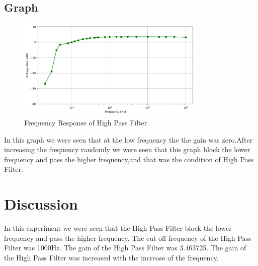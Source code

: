 \documentclass[12pt]{article}
\begin{document}
\newpage
\subsection{Graph}

\begin{figure}[h]
    \centering
    \includegraphics[width=0.8\textwidth]{HPF_Graph.png}
    \caption{Frequency Response of High Pass Filter}
\end{figure}

In this graph we were seen that at the low frequency the the gain was zero.After increasing the frequency randomly we were seen that this graph block the lower frequency and pass the higher frequency,and that was the condition of High Pass Filter.

\section{Discussion}
In this experiment we were seen that the High Pass Filter block the lower frequency and pass the higher frequency. The cut off frequency of the High Pass Filter was 1000Hz. The gain of the High Pass Filter was 3.463725. The gain of the High Pass Filter was increased with the increase of the frequency.
\end{document}
